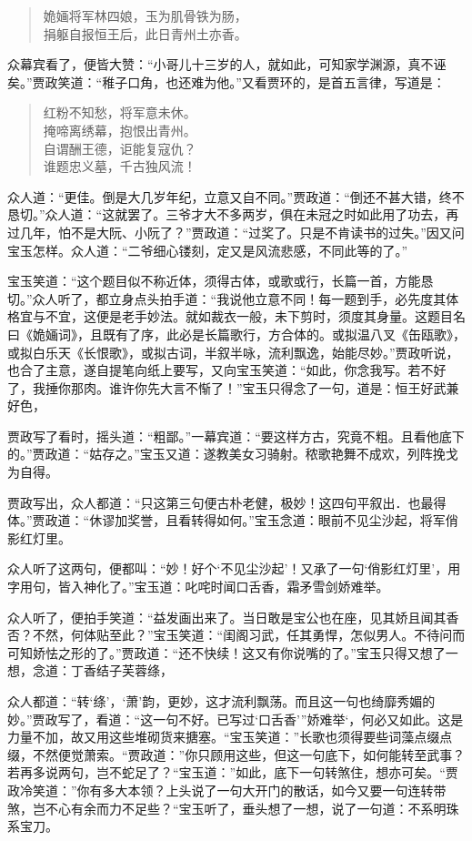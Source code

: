 \documentclass[12pt,oneside]{book}
\newenvironment{shici}{%
\begin{verse}%
\centering\large\hspace{12pt}}%
{\end{verse}}
\begin{document}
\begin{shici}
姽婳将军林四娘，玉为肌骨铁为肠，\\
捐躯自报恒王后，此日青州土亦香。
\end{shici}


众幕宾看了，便皆大赞：“小哥儿十三岁的人，就如此，可知家学渊源，真不诬矣。”贾政笑道：“稚子口角，也还难为他。”又看贾环的，是首五言律，写道是：

\begin{shici}
红粉不知愁，将军意未休。\\
掩啼离绣幕，抱恨出青州。\\
自谓酬王德，讵能复寇仇？\\
谁题忠义墓，千古独风流！
\end{shici}


众人道：“更佳。倒是大几岁年纪，立意又自不同。”贾政道：“倒还不甚大错，终不恳切。”众人道：“这就罢了。三爷才大不多两岁，俱在未冠之时如此用了功去，再过几年，怕不是大阮、小阮了？”贾政道：“过奖了。只是不肯读书的过失。”因又问宝玉怎样。众人道：“二爷细心镂刻，定又是风流悲感，不同此等的了。”

宝玉笑道：“这个题目似不称近体，须得古体，或歌或行，长篇一首，方能恳切。”众人听了，都立身点头拍手道：“我说他立意不同！每一题到手，必先度其体格宜与不宜，这便是老手妙法。就如裁衣一般，未下剪时，须度其身量。这题目名曰《姽婳词》，且既有了序，此必是长篇歌行，方合体的。或拟温八叉《缶瓯歌》，或拟白乐天《长恨歌》，或拟古词，半叙半咏，流利飘逸，始能尽妙。”贾政听说，也合了主意，遂自提笔向纸上要写，又向宝玉笑道：“如此，你念我写。若不好了，我捶你那肉。谁许你先大言不惭了！”宝玉只得念了一句，道是：恒王好武兼好色，

贾政写了看时，摇头道：“粗鄙。”一幕宾道：“要这样方古，究竟不粗。且看他底下的。”贾政道：“姑存之。”宝玉又道：遂教美女习骑射。秾歌艳舞不成欢，列阵挽戈为自得。

贾政写出，众人都道：“只这第三句便古朴老健，极妙！这四句平叙出．也最得体。”贾政道：“休谬加奖誉，且看转得如何。”宝玉念道：眼前不见尘沙起，将军俏影红灯里。

众人听了这两句，便都叫：“妙！好个‘不见尘沙起’！又承了一句‘俏影红灯里’，用字用句，皆入神化了。”宝玉道：叱咤时闻口舌香，霜矛雪剑娇难举。

众人听了，便拍手笑道：“益发画出来了。当日敢是宝公也在座，见其娇且闻其香否？不然，何体贴至此？”宝玉笑道：“闺阁习武，任其勇悍，怎似男人。不待问而可知娇怯之形的了。”贾政道：“还不快续！这又有你说嘴的了。”宝玉只得又想了一想，念道：丁香结子芙蓉绦，

众人都道：“转‘绦’，‘萧’韵，更妙，这才流利飘荡。而且这一句也绮靡秀媚的妙。”贾政写了，看道：“这一句不好。已写过‘口舌香’”娇难举‘，何必又如此。这是力量不加，故又用这些堆砌货来搪塞。“宝玉笑道：”长歌也须得要些词藻点缀点缀，不然便觉萧索。“贾政道：”你只顾用这些，但这一句底下，如何能转至武事？若再多说两句，岂不蛇足了？“宝玉道：”如此，底下一句转煞住，想亦可矣。“贾政冷笑道：”你有多大本领？上头说了一句大开门的散话，如今又要一句连转带煞，岂不心有余而力不足些？“宝玉听了，垂头想了一想，说了一句道：不系明珠系宝刀。
\end{document}
